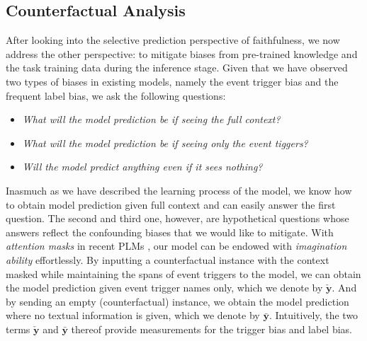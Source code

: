 \documentclass[11pt]{article}
\newcommand{\yb}{\mathbf{y}}
\begin{document}
\subsection{Counterfactual Analysis}\label{sec:counterfactual_analysis}
After looking into the selective prediction perspective of faithfulness, we now address the other perspective: to mitigate biases from pre-trained knowledge and the task training data during the inference stage.
Given that we have observed two types of biases in existing models, namely the event trigger bias and the frequent label bias, we ask the following questions:
\begin{itemize}[leftmargin=*]
\setlength\itemsep{-0.3em}
    \item \textit{What will the model prediction be if seeing the full context?}
    \item \textit{What will the model prediction be if seeing only the event tiggers?}
\item \textit{Will the model predict anything even if it sees nothing?}
    \vspace{-0.5em}
\end{itemize}
Inasmuch as we have described the learning process of the model, we know how to obtain model prediction given full context and can easily answer the first question.
The second and third one, however, are hypothetical questions whose answers reflect the confounding biases that we would like to mitigate.
With \emph{attention masks} in recent PLMs \cite{devlin-etal-2019-bert, liu2019roberta, joshi2020spanbert, lan2019albert}, our model can be endowed with \emph{imagination ability} effortlessly.
By inputting a counterfactual instance with the context masked while maintaining the spans of event triggers to the model, we can obtain the model prediction given event trigger names only, which we denote by $\check{\yb}$.
And by sending an empty (counterfactual) instance, we obtain the model prediction where no textual information is given, which we denote by $\bar{\yb}$.
Intuitively, the two terms $\check{\yb}$ and $\bar{\yb}$ thereof provide measurements for the trigger bias and label bias.
\end{document}
